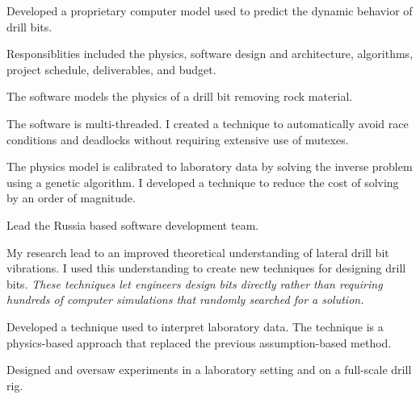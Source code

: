 \documentclass{leresume}
\begin{document}
		\begin{bulletedlist}
			
		\item 
					Developed a proprietary computer model used to predict the dynamic behavior of drill bits.
					
		\begin{bulletedlist}
			
		\item 
							Responsiblities included the physics, software design and architecture, algorithms, project schedule, deliverables, and budget.
						
		\item 
							The software models the physics of a drill bit removing rock material.
						
		\item 
							The software is multi-threaded.  I created a technique to automatically avoid race conditions and deadlocks without requiring extensive use of mutexes.
						
		\item 
							The physics model is calibrated to laboratory data by solving the inverse problem using a genetic algorithm.  I developed a technique to reduce the cost of solving by an order of magnitude.
						
		\item Lead the Russia based software development team.
		\end{bulletedlist}
	
		\item My research lead to an improved theoretical understanding of lateral drill bit vibrations.  I used this understanding to create new techniques for designing drill bits.  
		\textit{These techniques let engineers design bits directly rather than requiring hundreds of computer simulations that randomly searched for a solution.}
	
		\item Developed a technique used to interpret laboratory data.  The technique is a physics-based approach that replaced the previous assumption-based method.
		\item Designed and oversaw experiments in a laboratory setting and on a full-scale drill rig.
		\end{bulletedlist}
	

    
    
    
\end{document}
